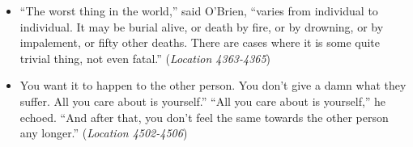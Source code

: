 \documentclass[12pt]{article}
\begin{document}
\begin{itemize}
\item {“The worst thing in the world,” said O’Brien, “varies from individual to individual. It may be burial alive, or death by fire, or by drowning, or by impalement, or fifty other deaths. There are cases where it is some quite trivial thing, not even fatal.” (\textit{Location 4363-4365})}
\item {You want it to happen to the other person. You don’t give a damn what they suffer. All you care about is yourself.” “All you care about is yourself,” he echoed. “And after that, you don’t feel the same towards the other person any longer.” (\textit{Location 4502-4506})}
\end{itemize}



\end{document}
